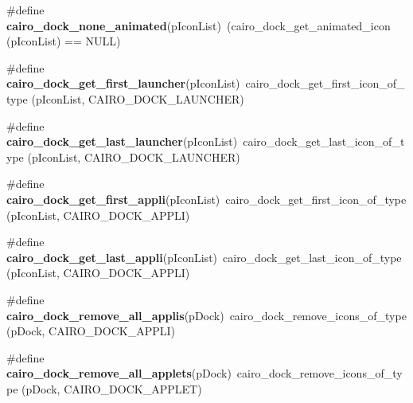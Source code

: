 \begin{CompactItemize}
\item 
\#define {\bf cairo\_\-dock\_\-none\_\-animated}(pIconList)~(cairo\_\-dock\_\-get\_\-animated\_\-icon (pIconList) == NULL)
\item 
\#define {\bf cairo\_\-dock\_\-get\_\-first\_\-launcher}(pIconList)~cairo\_\-dock\_\-get\_\-first\_\-icon\_\-of\_\-type (pIconList, CAIRO\_\-DOCK\_\-LAUNCHER)
\item 
\#define {\bf cairo\_\-dock\_\-get\_\-last\_\-launcher}(pIconList)~cairo\_\-dock\_\-get\_\-last\_\-icon\_\-of\_\-type (pIconList, CAIRO\_\-DOCK\_\-LAUNCHER)
\item 
\#define {\bf cairo\_\-dock\_\-get\_\-first\_\-appli}(pIconList)~cairo\_\-dock\_\-get\_\-first\_\-icon\_\-of\_\-type (pIconList, CAIRO\_\-DOCK\_\-APPLI)
\item 
\#define {\bf cairo\_\-dock\_\-get\_\-last\_\-appli}(pIconList)~cairo\_\-dock\_\-get\_\-last\_\-icon\_\-of\_\-type (pIconList, CAIRO\_\-DOCK\_\-APPLI)
\item 
\#define {\bf cairo\_\-dock\_\-remove\_\-all\_\-applis}(pDock)~cairo\_\-dock\_\-remove\_\-icons\_\-of\_\-type (pDock, CAIRO\_\-DOCK\_\-APPLI)
\item 
\#define {\bf cairo\_\-dock\_\-remove\_\-all\_\-applets}(pDock)~cairo\_\-dock\_\-remove\_\-icons\_\-of\_\-type (pDock, CAIRO\_\-DOCK\_\-APPLET)
\end{CompactItemize}
